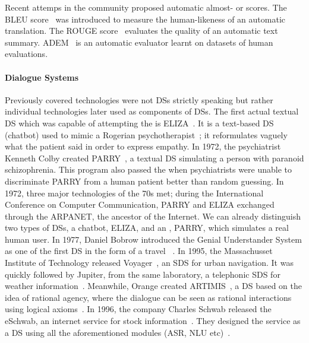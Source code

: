Recent attemps in the  community proposed automatic almost- or scores. The BLEU score~\parencite{BLEU}  was introduced to measure the human-likeness of an automatic translation. The ROUGE score~\parencite{ROUGE} evaluates the quality of an automatic text summary. ADEM~\parencite{ADEM} is an automatic  evaluator learnt on datasets of human evaluations.

\paragraph{Dialogue Systems}

Previously covered technologies were not \glspl{DS} strictly speaking but rather individual technologies later used as components of \glspl{DS}. The first actual textual \gls{DS} which
 was capable of attempting the  is ELIZA~\parencite{ELIZA}. It is a text-based \gls{DS} (chatbot) used to mimic a Rogerian psychotherapist~\parencite{rogerian}; it reformulates vaguely what the patient said in order to express empathy. In 1972, the psychiatrist Kenneth Colby created PARRY~\parencite{parry}, a textual \gls{DS} simulating a person with paranoid schizophrenia. This program also passed the  when psychiatrists were unable to discriminate PARRY from a human patient better than random guessing. In 1972, three major technologies of the 70s met; during the International Conference on Computer Communication, PARRY and ELIZA exchanged through the ARPANET, the ancestor of the Internet. We can already distinguish two types of \glspl{DS}, a chatbot, ELIZA, and an , PARRY, which simulates a real human user. In 1977, Daniel Bobrow introduced the Genial Understander System as one of the first  \gls{DS} in the form of a travel ~\parencite{gus}. In 1995, the Massachusset Institute of Technology released Voyager~\parencite{voyager}, an \gls{SDS} for urban navigation. It was quickly followed by Jupiter, from the same laboratory, a telephonic \gls{SDS} for weather information~\parencite{jupiter}. Meanwhile, Orange created ARTIMIS~\parencite{sadek1997artimis}, a \gls{DS} based on the idea of rational agency, where the dialogue can be seen as rational interactions using logical axioms~\parencite{cummings2010routledge}. In 1996, the company Charles Schwab released the eSchwab, an internet service for stock information~\parencite{cortada2005digital}. They designed the service as a \gls{DS} using all the aforementioned modules (\gls{ASR}, \gls{NLU} etc)~\parencite{these-pietquin}.

